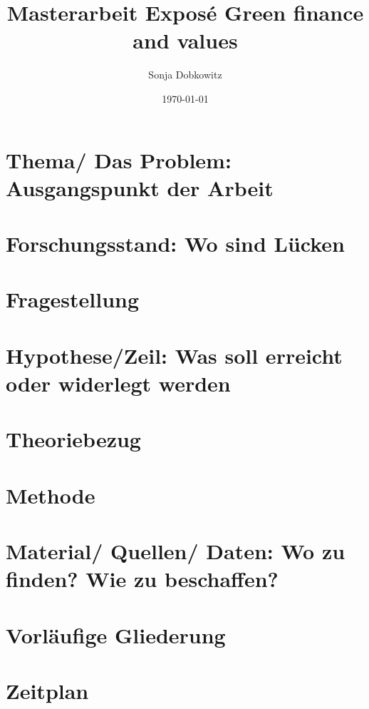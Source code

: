 \documentclass{article}
\title{Masterarbeit Exposé Green finance and values}
\author{Sonja Dobkowitz}
\date{\today}
\begin{document}
\maketitle
\section{Thema/ Das Problem: Ausgangspunkt der Arbeit}

\section{Forschungsstand: Wo sind Lücken}
\section{Fragestellung}
\section{Hypothese/Zeil: Was soll erreicht oder widerlegt werden}
\section{Theoriebezug}
\section{Methode}
\section{Material/ Quellen/ Daten: Wo zu finden? Wie zu beschaffen?}

\section{Vorläufige Gliederung}
\section{Zeitplan}
\end{document}
